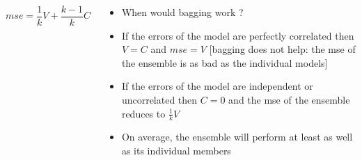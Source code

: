 \begin{frame}
	\begin{columns}
		\begin{overlayarea}{\textwidth}{\textheight}
			\begin{equation*}
				mse=\frac{1}{k}V+\frac{k-1}{k}C
			\end{equation*}
		\end{overlayarea}
		\begin{overlayarea}{\textwidth}{\textheight}
			\begin{itemize}
				\justifying
				\item<2->  When would bagging work ?
				\item <3-> If the errors of the model are perfectly correlated then $V=C$ and $mse=V$ [bagging does not help: the mse of the ensemble is as bad as the individual models]
				\item<4->  If the errors of the model are independent or uncorrelated then $C=0$ and the mse of the ensemble reduces to $\frac{1}{k}V$
				\item <5-> On average, the ensemble will perform at least as well as its individual members
			\end{itemize}
		\end{overlayarea}
	\end{columns}
\end{frame}
